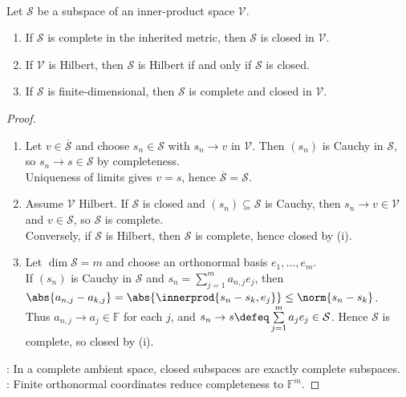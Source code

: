 \begin{theorem} \label{thm:complete-and-closed-subspaces-hilbert} \\
Let $\mathcal{S}$ be a subspace of an inner-product space $\mathcal{V}$.
\begin{enumerate}[label=(\roman*)]
\setlength{\itemsep}{0pt}
\item If $\mathcal{S}$ is complete in the inherited metric, then $\mathcal{S}$ is closed in $\mathcal{V}$.
\item If $\mathcal{V}$ is Hilbert, then $\mathcal{S}$ is Hilbert if and only if $\mathcal{S}$ is closed.
\item If $\mathcal{S}$ is finite-dimensional, then $\mathcal{S}$ is complete and closed in $\mathcal{V}$.
\end{enumerate}
\begin{proof}
\begin{enumerate}[label=(\roman*)]
\setlength{\itemsep}{0pt}
\item Let $v\in\overline{\mathcal S}$ and choose $s_n\in\mathcal S$ with $s_n\to v$ in $\mathcal V$. Then $(s_n)$ is Cauchy in $\mathcal S$, so $s_n\to s\in\mathcal S$ by completeness.\\
Uniqueness of limits gives $v=s$, hence $\overline{\mathcal S}=\mathcal S$.
\item Assume $\mathcal V$ Hilbert. If $\mathcal S$ is closed and $(s_n)\subseteq\mathcal S$ is Cauchy, then $s_n\to v\in\mathcal V$ and $v\in\mathcal S$, so $\mathcal S$ is complete.\\
Conversely, if $\mathcal S$ is Hilbert, then $\mathcal S$ is complete, hence closed by (i).
\item Let $\dim\mathcal S=m$ and choose an orthonormal basis $e_1,\ldots,e_m$.\\
If $(s_n)$ is Cauchy in $\mathcal S$ and $s_n=\sum\limits_{j=1}^m a_{n,j}e_j$, then $\abs{a_{n,j}-a_{k,j}}=\abs{\innerprod{s_n-s_k,e_j}}\leq\norm{s_n-s_k}$.\\
Thus $a_{n,j}\to a_j\in\mathbb F$ for each $j$, and $s_n\to s\defeq\sum\limits_{j=1}^m a_je_j\in\mathcal S$. Hence $\mathcal S$ is complete, so closed by (i).
\end{enumerate}
: In a complete ambient space, closed subspaces are exactly complete subspaces.\\
: Finite orthonormal coordinates reduce completeness to $\mathbb F^m$.
\end{proof}
\end{theorem}


